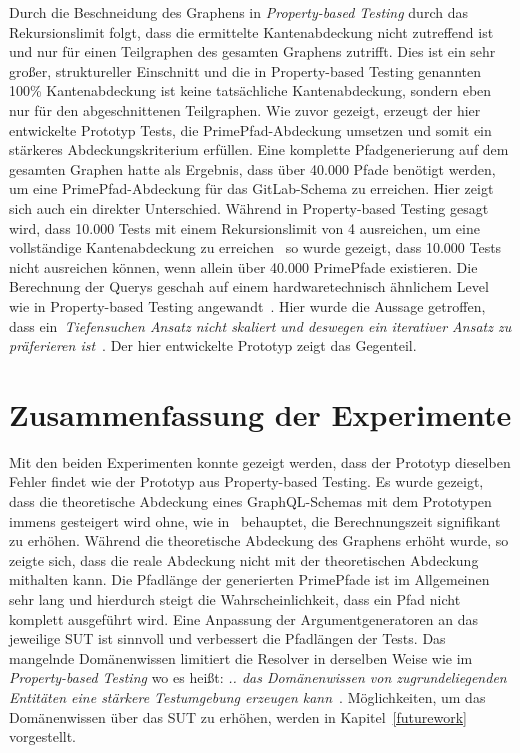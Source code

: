 Durch die Beschneidung des Graphens in \textit{Property-based Testing} durch das Rekursionslimit folgt, dass die ermittelte Kantenabdeckung
nicht zutreffend ist und nur für einen Teilgraphen des gesamten Graphens zutrifft.
Dies ist ein sehr großer, struktureller Einschnitt und die in Property-based Testing genannten 100\% Kantenabdeckung ist keine tatsächliche Kantenabdeckung,
sondern eben nur für den abgeschnittenen Teilgraphen.
Wie zuvor gezeigt, erzeugt der hier entwickelte Prototyp Tests, die PrimePfad-Abdeckung umsetzen und somit ein stärkeres Abdeckungskriterium erfüllen.
Eine komplette Pfadgenerierung auf dem gesamten Graphen hatte als Ergebnis, dass über 40.000 Pfade benötigt werden, um eine PrimePfad-Abdeckung für das GitLab-Schema zu erreichen.
Hier zeigt sich auch ein direkter Unterschied.
Während in Property-based Testing gesagt wird, dass 10.000 Tests mit einem Rekursionslimit von 4 ausreichen, um eine vollständige Kantenabdeckung zu erreichen~\cite[vgl. Table 1]{property-based-testing}
so wurde gezeigt, dass 10.000 Tests nicht ausreichen können, wenn allein über 40.000 PrimePfade existieren.
Die Berechnung der Querys geschah auf einem hardwaretechnisch ähnlichem Level wie in Property-based Testing angewandt~\cite[vgl. Experimental Setup]{property-based-testing}.
Hier wurde die Aussage getroffen, dass ein~\textit{Tiefensuchen Ansatz nicht skaliert und deswegen ein iterativer Ansatz zu präferieren ist}~\cite{property-based-testing}.
Der hier entwickelte Prototyp zeigt das Gegenteil.

\section{Zusammenfassung der Experimente}

Mit den beiden Experimenten konnte gezeigt werden, dass der Prototyp dieselben Fehler findet wie der Prototyp aus Property-based Testing.
Es wurde gezeigt, dass die theoretische Abdeckung eines GraphQL-Schemas mit dem Prototypen immens gesteigert wird ohne,
wie in~\cite{property-based-testing} behauptet, die Berechnungszeit signifikant zu erhöhen.
Während die theoretische Abdeckung des Graphens erhöht wurde, so zeigte sich, dass die reale Abdeckung nicht mit der theoretischen Abdeckung mithalten kann.
Die Pfadlänge der generierten PrimePfade ist im Allgemeinen sehr lang und hierdurch steigt die Wahrscheinlichkeit, dass ein Pfad nicht komplett ausgeführt wird.
Eine Anpassung der Argumentgeneratoren an das jeweilige SUT ist sinnvoll und verbessert die Pfadlängen der Tests.
Das mangelnde Domänenwissen limitiert die Resolver in derselben Weise wie im \textit{Property-based Testing} wo es heißt:
\textit{.. das Domänenwissen von zugrundeliegenden Entitäten eine stärkere Testumgebung erzeugen kann}~\cite[S.8]{property-based-testing}.
Möglichkeiten, um das Domänenwissen über das SUT zu erhöhen, werden in Kapitel~\ref{futurework} vorgestellt.
